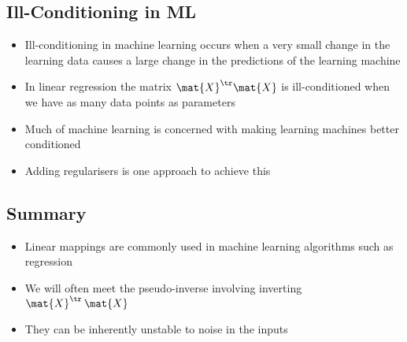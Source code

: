 \begin{slide}
\section{Ill-Conditioning in ML}

\begin{PauseHighLight}
  \begin{itemize}
  \item Ill-conditioning in machine learning occurs when a very small
    change in the learning data causes a large change in the predictions
    of the learning machine\pause
  \item In linear regression the matrix $\mat{X}^\tr\mat{X}$ is
    ill-conditioned when we have as many data points as parameters\pause
  \item Much of machine learning is concerned with making learning
    machines better conditioned\pause
  \item Adding regularisers is one approach to achieve this\pause
  \end{itemize}
\end{PauseHighLight}

\end{slide}



\begin{slide}
\section{Summary}

\begin{PauseHighLight}
  \begin{itemize}
  \item Linear mappings are commonly used in machine learning algorithms
    such as regression\pause
  \item We will often meet the pseudo-inverse involving inverting
    $\mat{X}^\tr\,\mat{X}$\pause 
  \item They can be inherently unstable to noise in the inputs\pause
  \end{itemize}
\end{PauseHighLight}

\end{slide}


